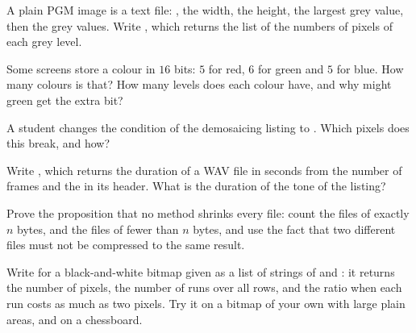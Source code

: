 \begin{exercise}[$\star\star$]\label{exo:g10:images-sound-compression:8}
A plain PGM image is a text file: , the width, the height, the largest grey value, then the grey values.
Write , which returns the list of the numbers of pixels of each grey level.
\end{exercise}

\begin{exercise}[$\star\star$]\label{exo:g10:images-sound-compression:9}
Some screens store a colour in $16$ bits: $5$ for red, $6$ for green and $5$ for blue. How many colours is that? How
many levels does each colour have, and why might green get the extra bit?
\end{exercise}

\begin{exercise}[$\star\star$]\label{exo:g10:images-sound-compression:10}
A student changes the condition of the demosaicing listing to . Which pixels
does this break, and how?
\end{exercise}

\begin{exercise}[$\star\star$]\label{exo:g10:images-sound-compression:11}
Write , which returns the duration of a WAV file in seconds from the number of frames and the
 in its header. What is the duration of the tone of the listing?
\end{exercise}

\begin{exercise}[$\star\star\star$]\label{exo:g10:images-sound-compression:12}
Prove the proposition that no  method shrinks every file: count the files of exactly $n$ bytes, and the files
of fewer than $n$ bytes, and use the fact that two different files must not be compressed to the same result.
\end{exercise}

\begin{exercise}[$\star\star\star$]\label{exo:g10:images-sound-compression:13}
Write  for a black-and-white bitmap given as a list of strings of  and : it
returns the number of pixels, the number of runs over all rows, and the ratio when each run costs as much as two
pixels. Try it on a bitmap of your own with large plain areas, and on a chessboard.
\end{exercise}


